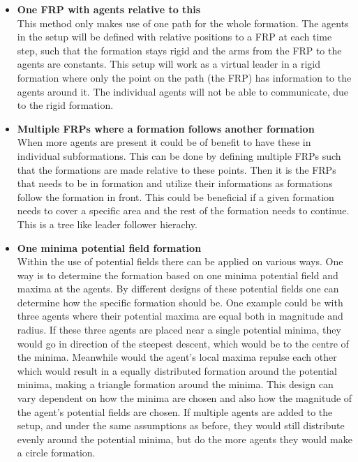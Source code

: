 \begin{itemize}
\begin{itemize}
	\end{itemize}
\item \textbf{One \ac{FRP} with agents relative to this}\\
This method only makes use of one path for the whole formation. The agents in the setup will be defined with relative positions to a \ac{FRP} at each time step, such that the formation stays rigid and the arms from the \ac{FRP} to the agents are constants. This setup will work as a virtual leader in a rigid formation where only the point on the path (the \ac{FRP}) has information to the agents around it. The individual agents will not be able to communicate, due to the rigid formation.
\item \textbf{Multiple \ac{FRP}s where a formation follows another formation}\\
When more agents are present it could be of benefit to have these in individual subformations. This can be done by defining multiple \ac{FRP}s such that the formations are made relative to these points. Then it is the \ac{FRP}s that needs to be in formation and utilize their informations as formations follow the formation in front. This could be beneficial if a given formation needs to cover a specific area and the rest of the formation needs to continue. This is a tree like leader follower hierachy.
\item \textbf{One minima potential field formation}\\
Within the use of potential fields there can be applied on various ways. One way is to determine the formation based on one minima potential field and maxima at the agents. By different designs of these potential fields one can determine how the specific formation should be. One example could be with three agents where their potential maxima are equal both in magnitude and radius. If these three agents are placed near a single potential minima, they would go in direction of the steepest descent, which would be to the centre of the minima. Meanwhile would the agent's local maxima repulse each other which would result in a equally distributed formation around the potential minima, making a triangle formation around the minima.
This design can vary dependent on how the minima are chosen and also how the magnitude of the agent's potential fields are chosen. If multiple agents are added to the setup, and under the same assumptions as before, they would still distribute evenly around the potential minima, but do the more agents they would make a circle formation. 

\end{itemize}

